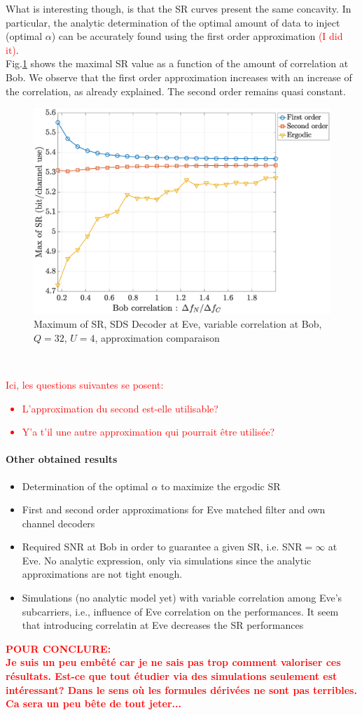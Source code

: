 \documentclass[12pt]{article}
\begin{document}
What is interesting though, is that the SR curves present the same concavity. In particular, the analytic determination of the optimal amount of data to inject (optimal $\alpha$) can be accurately found using the first order approximation \textcolor{red}{(I did it)}.\\

Fig.\ref{fig:maxSR1_approxComparaison} shows the maximal SR value as a function of the amount of correlation at Bob. We observe that the first order approximation increases with an increase of the correlation, as already explained. The second order remains quasi constant. 
\begin{figure}[htb!]
	\centering
	\includegraphics[width=.7\linewidth]{img/maxSR1_noCorrelE_variableB_approx_Q32U4.eps}
	\caption{Maximum of SR, SDS Decoder at Eve, variable correlation at Bob, $Q=32$, $U=4$, approximation comparaison}
	\label{fig:maxSR1_approxComparaison}
\end{figure}\\

\textcolor{red}{Ici, les questions suivantes se posent:
\begin{itemize}
	\item L'approximation du second est-elle utilisable?
	\item Y'a t'il une autre approximation qui pourrait être utilisée?
\end{itemize}}






\paragraph*{Other obtained results}
\begin{itemize}
	\item Determination of the optimal $\alpha$ to maximize the ergodic SR
	\item First and second order approximations for Eve matched filter and own channel decoders
	\item Required SNR at Bob in order to guarantee a given SR, i.e. SNR$= \infty$ at Eve. No analytic expression, only via simulations since the analytic approximations are not tight enough.
	\item Simulations (no analytic model yet) with variable correlation among Eve's subcarriers, i.e., influence of Eve correlation on the performances. It seem that introducing correlatin at Eve decreases the SR performances
\end{itemize}

\textcolor{red}{\textbf{POUR CONCLURE:\\
Je suis un peu embêté car je ne sais pas trop comment valoriser ces résultats. Est-ce que tout étudier via des simulations seulement est intéressant? Dans le sens où les formules dérivées ne sont pas terribles. Ca sera un peu bête de tout jeter...}}
\end{document}
